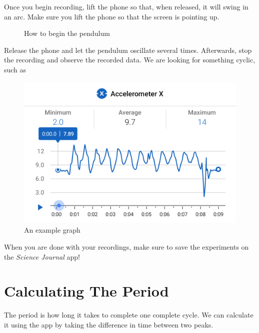 \documentclass[a4paper]{article}
\begin{document}
Once you begin recording, lift the phone so that, when released, it will swing in an arc. Make sure you lift the phone so that the screen is pointing up.

\begin{figure}[H]
    \centering
    \caption{How to begin the pendulum}
    \label{fig:my_label}
\end{figure}

Release the phone and let the pendulum oscillate several times. Afterwards, stop the recording and observe the recorded data. We are looking for something cyclic, such as 

\begin{figure}[H]
    \centering
    \includegraphics[scale=0.2]{graph.png}
    \caption{An example graph}
    \label{fig:my_label}
\end{figure}

When you are done with your recordings, make sure to save the experiments on the 
\textit{Science Journal} app!

\section{Calculating The Period}

The period is how long it takes to complete one complete cycle. We can calculate it using the app by taking the difference in time between two peaks.
\end{document}
